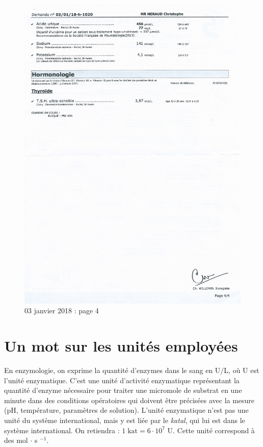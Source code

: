 \documentclass[12pt]{article}
\begin{document}
	\begin{figure}[!h]
		\begin{center}
		\includegraphics[scale=0.79]{03-01-2018/p4.JPG}
		\end{center}
		\caption{03 janvier 2018 : page 4}
	\end{figure}
	
\appendix
\section{Un mot sur les unités employées}
	En enzymologie, on exprime la quantité d'enzymes dans le sang en U$/$L, où U est l'unité enzymatique. C'est une unité d'activité enzymatique représentant la quantité d'enzyme nécessaire pour traiter une micromole de substrat en une minute dans des conditions opératoires qui doivent être précisées avec la mesure (pH, température, paramètres de solution). L'unité enzymatique n'est pas une unité du système international, mais y est liée par le \textit{katal}, qui lui est dans le système international. On retiendra : $1 \;\mathrm{kat} = 6 \cdot 10^7$ U. Cette unité correspond à des mol $\cdot$ s $^{-1}$.
	

\printindex

\listoffigures
\end{document}
